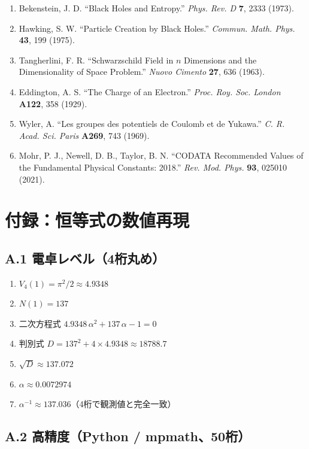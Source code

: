 \documentclass[a4paper,11pt]{ltjsarticle}
\begin{document}
\begin{enumerate}
\item Bekenstein, J. D. ``Black Holes and Entropy.'' \textit{Phys. Rev. D} \textbf{7}, 2333 (1973).
\item Hawking, S. W. ``Particle Creation by Black Holes.'' \textit{Commun. Math. Phys.} \textbf{43}, 199 (1975).
\item Tangherlini, F. R. ``Schwarzschild Field in $n$ Dimensions and the Dimensionality of Space Problem.'' \textit{Nuovo Cimento} \textbf{27}, 636 (1963).
\item Eddington, A. S. ``The Charge of an Electron.'' \textit{Proc. Roy. Soc. London} \textbf{A122}, 358 (1929).
\item Wyler, A. ``Les groupes des potentiels de Coulomb et de Yukawa.'' \textit{C. R. Acad. Sci. Paris} \textbf{A269}, 743 (1969).
\item Mohr, P. J., Newell, D. B., Taylor, B. N. ``CODATA Recommended Values of the Fundamental Physical Constants: 2018.'' \textit{Rev. Mod. Phys.} \textbf{93}, 025010 (2021).
\end{enumerate}

\section*{付録：恒等式の数値再現}

\subsection*{A.1 電卓レベル（4桁丸め）}

\begin{enumerate}
\item $V_4(1) = \pi^2/2 \approx 4.9348$
\item $N(1) = 137$
\item 二次方程式 $4.9348\, \alpha^2 + 137\, \alpha - 1 = 0$
\item 判別式 $D = 137^2 + 4 \times 4.9348 \approx 18788.7$
\item $\sqrt{D} \approx 137.072$
\item $\alpha \approx 0.0072974$
\item $\alpha^{-1} \approx 137.036$（4桁で観測値と完全一致）
\end{enumerate}

\subsection*{A.2 高精度（Python / mpmath、50桁）}
\end{document}
